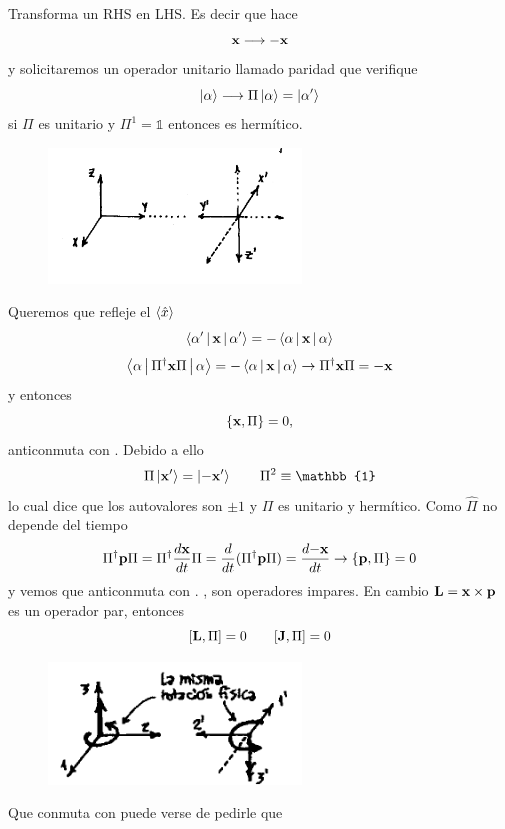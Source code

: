 \documentclass[10pt,oneside]{CBFT_book}
\begin{document}
Transforma un RHS en LHS. Es decir que hace 
\[
	\vb{x} \longrightarrow - \vb{x}
\]
y solicitaremos un operador unitario llamado paridad que verifique 
\[
	\Ket{\alpha} \longrightarrow \Pi\Ket{\alpha} = \Ket{\alpha'}
\]
si $\Pi$ es unitario y $\Pi^1=\mathbb{1}$ entonces es hermítico.
\begin{figure}[htb]
	\begin{center}
	\includegraphics[width=0.6\textwidth]{images/teo2_16.pdf}
	\end{center}
	\caption{}
\end{figure} 
Queremos que refleje el $\Braket{\hat{x}}$ 
\[
	\Braket{\alpha'|\vb{x}|\alpha'} = - \Braket{\alpha|\vb{x}|\alpha} 
\]
\[
	\Braket{\alpha|\Pi^\dagger\vb{x}\Pi|\alpha} = - \Braket{\alpha|\vb{x}|\alpha} \rightarrow
	\Pi^\dagger\vb{x}\Pi = -\vb{x} 
\]
y entonces 
\[
	\{\vb{x},\Pi\} = 0,
\]
anticonmuta con . Debido a ello 
\[
	\Pi\Ket{\vb{x}'} = \Ket{-\vb{x}'} \qquad \Pi^2 \equiv \mathbb{1}
\]
lo cual dice que los autovalores son $\pm 1$ y $\Pi$ es unitario y hermítico.
Como $\hat{\Pi}$ no depende del tiempo 
\[
	\Pi^\dagger\vb{p}\Pi = \Pi^\dagger\dtot{\vb{x}}{t}\Pi = \dtot{}{t}(\Pi^\dagger\vb{p}\Pi) = 
	\dtot{-\vb{x}}{t} \rightarrow \{\vb{p},\Pi\}= 0
\]
y vemos que anticonmuta con .
,  son operadores impares. En cambio $\vb{L}=\vb{x}\times\vb{p}$ es un operador par, entonces 
\[
	[\vb{L},\Pi] = 0 \qquad [\vb{J},\Pi] = 0
\]
\begin{figure}[htb]
	\begin{center}
	\includegraphics[width=0.6\textwidth]{images/teo2_17.pdf}
	\end{center}
	\caption{}
\end{figure} 
Que conmuta con  puede verse de pedirle que 
\end{document}
